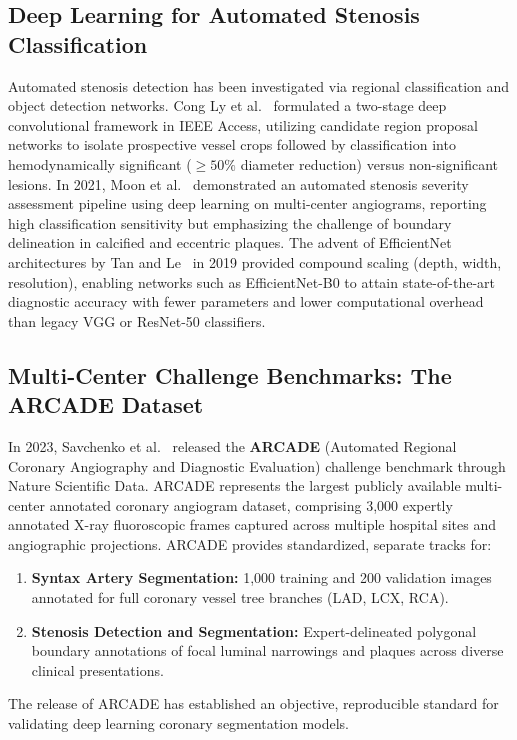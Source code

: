 \subsection{Deep Learning for Automated Stenosis Classification}
Automated stenosis detection has been investigated via regional classification and object detection networks. Cong Ly et al.~\cite{congly2020stenosis} formulated a two-stage deep convolutional framework in IEEE Access, utilizing candidate region proposal networks to isolate prospective vessel crops followed by classification into hemodynamically significant ($\ge 50\%$ diameter reduction) versus non-significant lesions. In 2021, Moon et al.~\cite{moon2021automated} demonstrated an automated stenosis severity assessment pipeline using deep learning on multi-center angiograms, reporting high classification sensitivity but emphasizing the challenge of boundary delineation in calcified and eccentric plaques. The advent of EfficientNet architectures by Tan and Le~\cite{tan2019efficientnet} in 2019 provided compound scaling (depth, width, resolution), enabling networks such as EfficientNet-B0 to attain state-of-the-art diagnostic accuracy with fewer parameters and lower computational overhead than legacy VGG or ResNet-50 classifiers.

\subsection{Multi-Center Challenge Benchmarks: The ARCADE Dataset}
In 2023, Savchenko et al.~\cite{arcade2023challenge} released the \textbf{ARCADE} (Automated Regional Coronary Angiography and Diagnostic Evaluation) challenge benchmark through Nature Scientific Data. ARCADE represents the largest publicly available multi-center annotated coronary angiogram dataset, comprising 3,000 expertly annotated X-ray fluoroscopic frames captured across multiple hospital sites and angiographic projections. ARCADE provides standardized, separate tracks for:
\begin{enumerate}
    \item \textbf{Syntax Artery Segmentation:} 1,000 training and 200 validation images annotated for full coronary vessel tree branches (LAD, LCX, RCA).
    \item \textbf{Stenosis Detection and Segmentation:} Expert-delineated polygonal boundary annotations of focal luminal narrowings and plaques across diverse clinical presentations.
\end{enumerate}
The release of ARCADE has established an objective, reproducible standard for validating deep learning coronary segmentation models.

